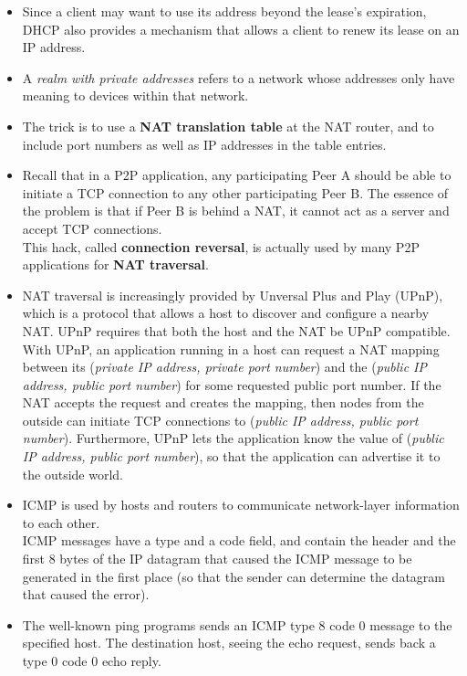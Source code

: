 \begin{itemize}
\item
Since a client may want to use its address beyond the lease's expiration, DHCP also provides a mechanism that allows a client to renew its lease on an IP address.

\item
A \textit{realm with private addresses} refers to a network whose addresses only have meaning to devices within that network.

\item
The trick is to use a \textbf{NAT translation table} at the NAT router, and to include port numbers as well as IP addresses in the table entries.

\item
Recall that in a P2P application, any participating Peer A should be able to initiate a TCP connection to any other participating Peer B. The essence of the problem is that if Peer B is behind a NAT, it cannot act as a server and accept TCP connections.\\
This hack, called \textbf{connection reversal}, is actually used by many P2P applications for \textbf{NAT traversal}.

\item
NAT traversal is increasingly provided by Unversal Plus and Play (UPnP), which is a protocol that allows a host to discover and configure a nearby NAT. UPnP requires that both the host and the NAT be UPnP compatible. With UPnP, an application running in a host can request a NAT mapping between its (\textit{private IP address, private port number}) and the (\textit{public IP address, public port number}) for some requested public port number. If the NAT accepts the request and creates the mapping, then nodes from the outside can initiate TCP connections to (\textit{public IP address, public port number}). Furthermore, UPnP lets the application know the value of (\textit{public IP address, public port number}), so that the application can advertise it to the outside world.

\item
ICMP is used by hosts and routers to communicate network-layer information to each other.\\
ICMP messages have a type and a code field, and contain the header and the first 8 bytes of the IP datagram that caused the ICMP message to be generated in the first place (so that the sender can determine the datagram that caused the error).

\item
The well-known ping programs sends an ICMP type 8 code 0 message to the specified host. The destination host, seeing the echo request, sends back a type 0 code 0 echo reply.


\end{itemize}
